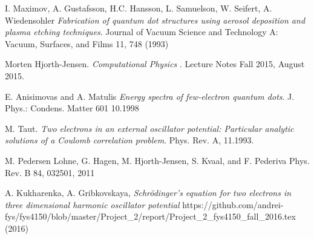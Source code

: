 \documentclass[10pt]{article}
\begin{document}
\newpage
\begin{thebibliography}{2}

I. Maximov, A. Gustafsson, H.C. Hansson, L. Samuelson, W. Seifert, A. Wiedensohler
\textit{Fabrication of quantum dot structures using aerosol deposition and plasma etching techniques}.
Journal of Vacuum Science and Technology A: Vacuum, Surfaces, and Films 11, 748 (1993)

Morten Hjorth-Jensen. 
\textit{Computational Physics
}. 
Lecture Notes Fall 2015, August 2015.


E. Anisimovas and A. Matulis
\textit{Energy spectra of few-electron quantum dots}. 
J. Phys.: Condens. Matter 601 10.1998

M. Taut.
\textit{Two electrons in an external oscillator potential: Particular analytic solutions of a Coulomb correlation problem}.
Phys. Rev. A, 11.1993.

M. Pedersen Lohne, G. Hagen, M. Hjorth-Jensen, S. Kvaal, and F. Pederiva 
\textit{}
Phys. Rev. B 84, 032501, 2011


A. Kukharenka, A. Gribkovskaya,
\textit
{Schr\"{o}dinger's equation for two electrons in three dimensional harmonic oscillator potential
}
https://github.com/andrei-fys/fys4150/blob/master/Project\_2/report/Project\_2\_fys4150\_fall\_2016.tex (2016)

\end{thebibliography}
\end{document}
